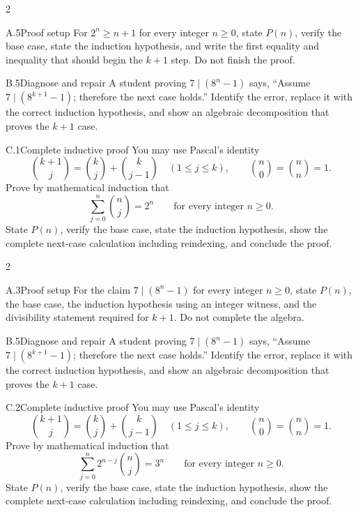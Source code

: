 \documentclass[9pt]{extarticle}
\begin{document}
\CoreWorkArea
\FormBreak
{}
\begin{multicols}{2}
\begin{CompactCoreProblem}{A.5}{Proof setup}
For $2^n\ge n+1$ for every integer $n\ge0$, state $P(n)$, verify the base case, state the induction hypothesis, and write the first equality and inequality that should begin the $k+1$ step. Do not finish the proof.
\end{CompactCoreProblem}
\begin{CompactCoreProblem}{B.5}{Diagnose and repair}
A student proving $7\mid(8^n-1)$ says, “Assume $7\mid(8^{k+1}-1)$; therefore the next case holds.” Identify the error, replace it with the correct induction hypothesis, and show an algebraic decomposition that proves the $k+1$ case.
\end{CompactCoreProblem}
\end{multicols}
\begin{CompactCoreProblem}{C.1}{Complete inductive proof}
You may use Pascal's identity
\[
\binom{k+1}{j}=\binom{k}{j}+\binom{k}{j-1}
\quad(1\le j\le k),\qquad
\binom{n}{0}=\binom{n}{n}=1.
\]
Prove by mathematical induction that
\[
\sum_{j=0}^{n}\binom{n}{j}=2^n\qquad\text{for every integer }n\ge0.
\]
State $P(n)$, verify the base case, state the induction hypothesis, show the complete next-case calculation including reindexing, and conclude the proof.
\end{CompactCoreProblem}
\CoreWorkArea
\FormBreak
{}
\begin{multicols}{2}
\begin{CompactCoreProblem}{A.3}{Proof setup}
For the claim $7\mid(8^n-1)$ for every integer $n\ge0$, state $P(n)$, the base case, the induction hypothesis using an integer witness, and the divisibility statement required for $k+1$. Do not complete the algebra.
\end{CompactCoreProblem}
\begin{CompactCoreProblem}{B.5}{Diagnose and repair}
A student proving $7\mid(8^n-1)$ says, “Assume $7\mid(8^{k+1}-1)$; therefore the next case holds.” Identify the error, replace it with the correct induction hypothesis, and show an algebraic decomposition that proves the $k+1$ case.
\end{CompactCoreProblem}
\end{multicols}
\begin{CompactCoreProblem}{C.2}{Complete inductive proof}
You may use Pascal's identity
\[
\binom{k+1}{j}=\binom{k}{j}+\binom{k}{j-1}
\quad(1\le j\le k),\qquad
\binom{n}{0}=\binom{n}{n}=1.
\]
Prove by mathematical induction that
\[
\sum_{j=0}^{n} 2^{n-j}\binom{n}{j}=3^n\qquad\text{for every integer }n\ge0.
\]
State $P(n)$, verify the base case, state the induction hypothesis, show the complete next-case calculation including reindexing, and conclude the proof.
\end{CompactCoreProblem}
\end{document}
